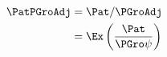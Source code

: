   \begin{equation}\begin{gathered}\begin{aligned}
    \PatPGroAdj  & = \Pat/\PGroAdj
    \\ & = \Ex\left(\frac{\Pat}{\PGro \psi}\right)
  \end{aligned}\end{gathered}\end{equation}
